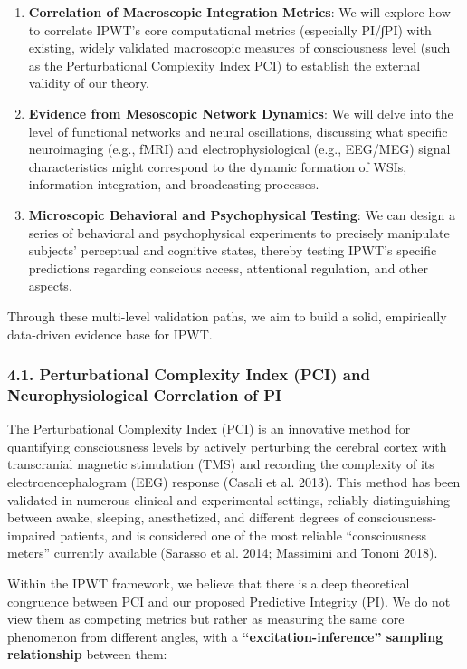 \documentclass[
  a4paper]{article}
\providecommand{\tightlist}{%
  \setlength{\itemsep}{0pt}\setlength{\parskip}{0pt}}
\begin{document}
\begin{enumerate}
\def\labelenumi{\arabic{enumi}.}
\tightlist
\item
  \textbf{Correlation of Macroscopic Integration Metrics}: We will
  explore how to correlate IPWT's core computational metrics (especially
  PI/∫PI) with existing, widely validated macroscopic measures of
  consciousness level (such as the Perturbational Complexity Index PCI)
  to establish the external validity of our theory.
\item
  \textbf{Evidence from Mesoscopic Network Dynamics}: We will delve into
  the level of functional networks and neural oscillations, discussing
  what specific neuroimaging (e.g., fMRI) and electrophysiological
  (e.g., EEG/MEG) signal characteristics might correspond to the dynamic
  formation of WSIs, information integration, and broadcasting
  processes.
\item
  \textbf{Microscopic Behavioral and Psychophysical Testing}: We can
  design a series of behavioral and psychophysical experiments to
  precisely manipulate subjects' perceptual and cognitive states,
  thereby testing IPWT's specific predictions regarding conscious
  access, attentional regulation, and other aspects.
\end{enumerate}

Through these multi-level validation paths, we aim to build a solid,
empirically data-driven evidence base for IPWT.

\subsubsection{4.1. Perturbational Complexity Index (PCI) and
Neurophysiological Correlation of
PI}\label{perturbational-complexity-index-pci-and-neurophysiological-correlation-of-pi}

The Perturbational Complexity Index (PCI) is an innovative method for
quantifying consciousness levels by actively perturbing the cerebral
cortex with transcranial magnetic stimulation (TMS) and recording the
complexity of its electroencephalogram (EEG) response (Casali et al.
2013). This method has been validated in numerous clinical and
experimental settings, reliably distinguishing between awake, sleeping,
anesthetized, and different degrees of consciousness-impaired patients,
and is considered one of the most reliable ``consciousness meters''
currently available (Sarasso et al. 2014; Massimini and Tononi 2018).

Within the IPWT framework, we believe that there is a deep theoretical
congruence between PCI and our proposed Predictive Integrity (PI). We do
not view them as competing metrics but rather as measuring the same core
phenomenon from different angles, with a
\textbf{``excitation-inference'' sampling relationship} between them:
\end{document}
